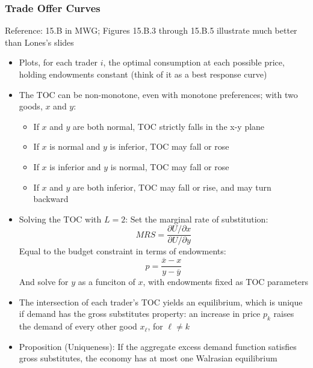 \documentclass{article}
\newcommand{\olx}{\overline{x}}
\newcommand{\oly}{\overline{y}}
\newcommand{\red}[1]{{\color{red}#1}}
\newcommand{\blue}[1]{{\color{blue}#1}}
\begin{document}
\subsubsection{Trade Offer Curves}
\red{Reference: 15.B in MWG; Figures 15.B.3 through 15.B.5 illustrate much better than Lones's slides}
\begin{itemize}
	\item Plots, for each trader $i$, the optimal consumption at each possible price, holding endowments constant (think of it as a best response curve)
	\item The TOC can be non-monotone, even with monotone preferences; with two goods, $x$ and $y$:
		\begin{itemize}
			\item If $x$ and $y$ are both normal, TOC strictly falls in the x-y plane
			\item If $x$ is normal and $y$ is inferior, TOC may fall or rose
			\item If $x$ is inferior and $y$ is normal, TOC may fall or rose
			\item If $x$ and $y$ are both inferior, TOC may fall or rise, and may turn backward
		\end{itemize}
	\item \blue{Solving the TOC with $L=2$:} Set the marginal rate of substitution: 
		\[
			MRS = \frac{\partial U/\partial x}{\partial U/\partial y}
		\]
		Equal to the budget constraint in terms of endowments:
		\[
			p = \frac{\olx - x}{y-\oly}
		\]
		And solve for $y$ as a funciton of $x$, with endowments fixed as TOC parameters
	\item The intersection of each trader's TOC yields an equilibrium, which is unique if demand has the \blue{gross substitutes property}: an increase in price $p_k$ raises the demand of every other good $x_\ell$, for $\ell\neq k$
	\item \blue{Proposition (Uniqueness):} If the aggregate excess demand function satisfies gross substitutes, the economy has at most one Walrasian equilibrium
\end{itemize}
\end{document}
